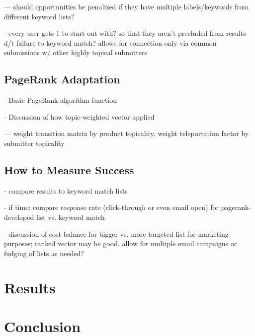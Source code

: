 \documentclass[]{report}   %
\begin{document}
--- should opportunities be penalized if they have multiple labels/keywords from different keyword lists?

- every user gets 1 to start out with? so that they aren't precluded from results d/t failure to keyword match? allows for connection only via common submissions w/ other highly topical submitters

\section{PageRank Adaptation}

- Basic PageRank algorithm function

- Discussion of how topic-weighted vector applied

--- weight transition matrix by product topicality, weight teleportation factor by submitter topicality

\section{How to Measure Success}

- compare results to keyword match lists

- if time: compare response rate (click-through or even email open) for pagerank-developed list vs. keyword match

- discussion of cost balance for bigger vs. more targeted list for marketing purposes; ranked vector may be good, allow for multiple email campaigns or fudging of lists as needed?

\chapter{Results}
\chapter{Conclusion}        

\appendix
\appendixpage
\addappheadtotoc
\end{document}
